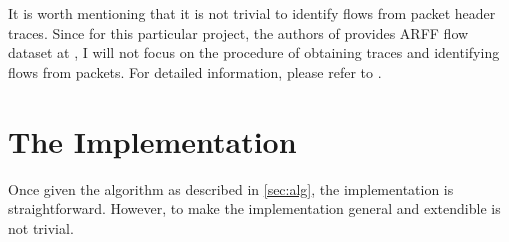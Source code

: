 \documentclass[a4paper,12pt]{article}
\begin{document}
It is worth mentioning that it is not trivial to identify flows from packet header traces. Since for this particular project, the authors of \cite{moore2005itc} provides ARFF flow dataset at \cite{moore_website}, I will not focus on the procedure of obtaining traces and identifying flows from packets. For detailed information, please refer to \cite{moore2005duf}.

\section{The Implementation}
Once given the algorithm as described in \ref{sec:alg}, the implementation is straightforward. However, to make the implementation general and extendible is not trivial.



\end{document}
